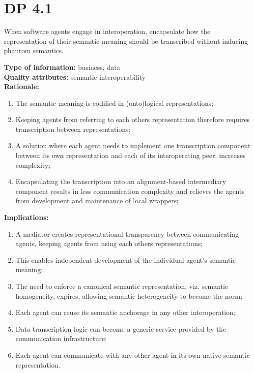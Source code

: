 \documentclass[sort&compress,preprint,authoryear,3p,twocolumn]{elsarticle}
\begin{document}
\hypertarget{dp-4.1}{%
\section{DP 4.1}\label{dp-4.1}}

\begin{mmdp}\label{dp:mediation}

When software agents engage in interoperation, encapsulate how the representation of their semantic meaning should be transcribed without inducing phantom semantics.   

\textbf{Type of information:} business, data  \\
\textbf{Quality attributes:} semantic interoperability   \\
\textbf{Rationale:}
\begin{enumerate}
  \item The semantic meaning is codified in (onto)logical representations;
  \item Keeping agents from referring to each others representation therefore requires transcription between representations;
  \item A solution where each agent needs to implement one transcription component between its own representation and each of its interoperating peer, increases complexity;
  \item Encapsulating the transcription into an alignment-based intermediary component results in less communication complexity and relieves the agents from development and maintenance of local wrappers;
\end{enumerate}
\textbf{Implications:}
\begin{enumerate}
  \item A mediator creates representational transparency between communicating agents, keeping agents from using each others representations;
  \item This enables independent development of the individual agent’s semantic meaning;
  \item The need to enforce a canonical semantic representation, viz. semantic homogeneity, expires, allowing semantic heterogeneity to become the norm;
  \item Each agent can reuse its semantic anchorage in any other interoperation;
  \item Data transcription logic can become a generic service provided by the communication infrastructure;
  \item Each agent can communicate with any other agent in its own native semantic representation.
\end{enumerate}  
\end{mmdp}
\end{document}
